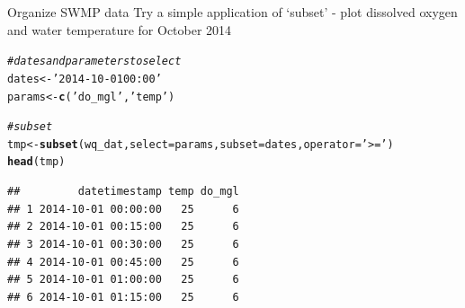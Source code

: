 \documentclass[xcolor=svgnames]{beamer}\usepackage[]{graphicx}\usepackage[]{color}
\makeatletter
\newcommand{\hlstr}[1]{\textcolor[rgb]{0.192,0.494,0.8}{#1}}%
\newcommand{\hlcom}[1]{\textcolor[rgb]{0.678,0.584,0.686}{\textit{#1}}}%
\newcommand{\hlstd}[1]{\textcolor[rgb]{0.345,0.345,0.345}{#1}}%
\newcommand{\hlkwb}[1]{\textcolor[rgb]{0.69,0.353,0.396}{#1}}%
\newcommand{\hlkwc}[1]{\textcolor[rgb]{0.333,0.667,0.333}{#1}}%
\newcommand{\hlkwd}[1]{\textcolor[rgb]{0.737,0.353,0.396}{\textbf{#1}}}%
\newenvironment{kframe}{%
 \def\at@end@of@kframe{}%
 \ifinner\ifhmode%
  \def\at@end@of@kframe{\end{minipage}}%
  \begin{minipage}{\columnwidth}%
 \fi\fi%
 \def\FrameCommand##1{\hskip\@totalleftmargin \hskip-\fboxsep
 \colorbox{shadecolor}{##1}\hskip-\fboxsep
     \hskip-\linewidth \hskip-\@totalleftmargin \hskip\columnwidth}%
 \MakeFramed {\advance\hsize-\width
   \@totalleftmargin\z@ \linewidth\hsize
   \@setminipage}}%
 {\par\unskip\endMakeFramed%
 \at@end@of@kframe}
\newenvironment{knitrout}{}{} %
\makeatother
\begin{document}
\begin{frame}[containsverbatim]{Organize SWMP data}
Try a simple application of `subset' - plot dissolved oxygen and water temperature for October 2014
\begin{knitrout}\scriptsize
{}\color{fgcolor}\begin{kframe}
\begin{alltt}
\hlcom{# dates and parameters  to select}
\hlstd{dates} \hlkwb{<-} \hlstr{'2014-10-01 00:00'}
\hlstd{params} \hlkwb{<-} \hlkwd{c}\hlstd{(}\hlstr{'do_mgl'}\hlstd{,} \hlstr{'temp'}\hlstd{)}

\hlcom{# subset}
\hlstd{tmp} \hlkwb{<-} \hlkwd{subset}\hlstd{(wq_dat,} \hlkwc{select} \hlstd{= params,} \hlkwc{subset} \hlstd{= dates,} \hlkwc{operator} \hlstd{=} \hlstr{'>='}\hlstd{)}
\hlkwd{head}\hlstd{(tmp)}
\end{alltt}
\begin{verbatim}
##         datetimestamp temp do_mgl
## 1 2014-10-01 00:00:00   25      6
## 2 2014-10-01 00:15:00   25      6
## 3 2014-10-01 00:30:00   25      6
## 4 2014-10-01 00:45:00   25      6
## 5 2014-10-01 01:00:00   25      6
## 6 2014-10-01 01:15:00   25      6
\end{verbatim}
\end{kframe}
\end{knitrout}
\end{frame}
\end{document}
